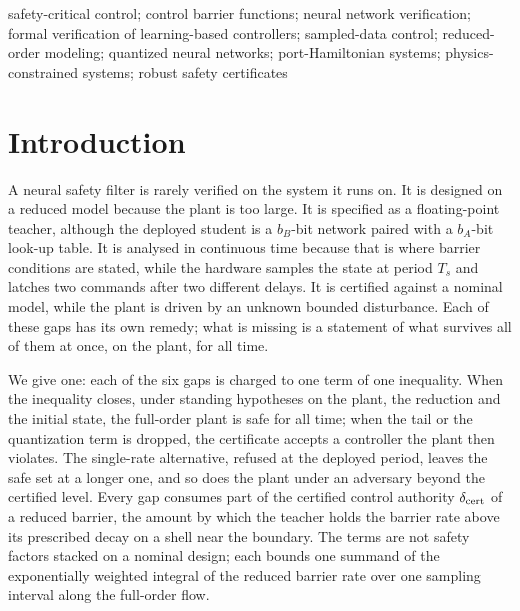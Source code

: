 \begin{keywords}
safety-critical control; control barrier functions; neural network verification; formal verification of learning-based controllers; sampled-data control; reduced-order modeling; quantized neural networks; port-Hamiltonian systems; physics-constrained systems; robust safety certificates
\end{keywords}

\section{Introduction}
\label{sec:intro}

A neural safety filter is rarely verified on the system it runs on. It is designed on a reduced model because the plant is too large. It is specified as a floating-point teacher, although the deployed student is a $b_B$-bit network paired with a $b_A$-bit look-up table. It is analysed in continuous time because that is where barrier conditions are stated, while the hardware samples the state at period $T_s$ and latches two commands after two different delays. It is certified against a nominal model, while the plant is driven by an unknown bounded disturbance. Each of these gaps has its own remedy; what is missing is a statement of what survives all of them at once, on the plant, for all time.

We give one: each of the six gaps is charged to one term of one inequality. When the inequality closes, under standing hypotheses on the plant, the reduction and the initial state, the full-order plant is safe for all time; when the tail or the quantization term is dropped, the certificate accepts a controller the plant then violates. The single-rate alternative, refused at the deployed period, leaves the safe set at a longer one, and so does the plant under an adversary beyond the certified level. Every gap consumes part of the certified control authority $\delta_{\mathrm{cert}}$ of a reduced barrier, the amount by which the teacher holds the barrier rate above its prescribed decay on a shell near the boundary. The terms are not safety factors stacked on a nominal design; each bounds one summand of the exponentially weighted integral of the reduced barrier rate over one sampling interval along the full-order flow.

